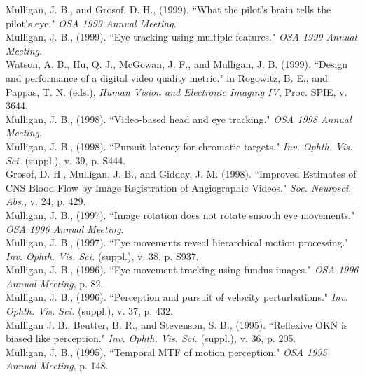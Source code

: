 \documentclass[12pt]{article}
\newcommand{\years}[1]{\marginnote{\scriptsize #1}}
\begin{document}
\years{1999}
Mulligan, J. B., and Grosof, D. H., (1999).
``What the pilot's brain tells the pilot's eye."
\emph{OSA 1999 Annual Meeting}.\\

Mulligan, J. B., (1999).
``Eye tracking using multiple features."
\emph{OSA 1999 Annual Meeting}.\\

Watson, A. B., Hu, Q. J., McGowan, J. F., and Mulligan, J. B. (1999).
``Design and performance of a digital video quality metric."
in Rogowitz, B. E., and Pappas, T. N. (eds.),
\emph{Human Vision and Electronic Imaging IV},
Proc. SPIE, v. 3644.\\

\years{1998}
Mulligan, J. B., (1998).
``Video-based head and eye tracking."
\emph{OSA 1998 Annual Meeting}.\\

Mulligan, J. B., (1998).
``Pursuit latency for chromatic targets."
\emph{Inv. Ophth. Vis. Sci.} (suppl.), v. 39, p. S444.\\

Grosof, D. H., Mulligan, J. B., and Gidday, J. M. (1998).
``Improved Estimates of CNS Blood Flow by Image Registration of Angiographic Videos."
\emph{Soc. Neurosci. Abs.}, v. 24, p. 429.\\

\years{1997}
Mulligan, J. B., (1997).
``Image rotation does not rotate smooth eye movements."
\emph{OSA 1996 Annual Meeting}.\\

Mulligan, J. B., (1997).
``Eye movements reveal hierarchical motion processing."
\emph{Inv. Ophth. Vis. Sci.} (suppl.), v. 38, p. S937.\\

\years{1996}
Mulligan, J. B., (1996).
``Eye-movement tracking using fundus images."
\emph{OSA 1996 Annual Meeting}, p. 82.\\

Mulligan, J. B., (1996).
``Perception and pursuit of velocity perturbations."
\emph{Inv. Ophth. Vis. Sci.} (suppl.), v. 37, p. 432.\\

\years{1995}
Mulligan J. B., Beutter, B. R., and Stevenson, S. B., (1995).
``Reflexive OKN is biased like perception."
\emph{Inv. Ophth. Vis. Sci.} (suppl.), v. 36, p. 205.\\

\clearpage
Mulligan, J. B., (1995).
``Temporal MTF of motion perception."
\emph{OSA 1995 Annual Meeting}, p. 148.\\
\end{document}
